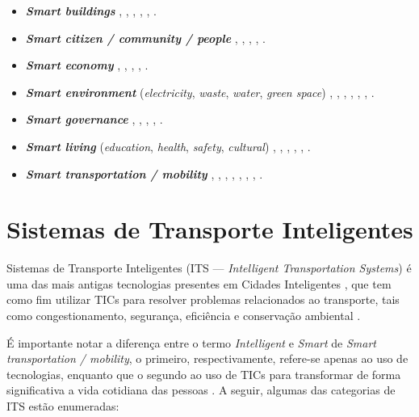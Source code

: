 \documentclass[
	12pt,				%
	oneside,			%
	a4paper,			%
	english,			%
	brazil				%
	]{abntex2ppgsi}
\begin{document}
\begin{itemize}
\item \textit{\textbf{Smart buildings}} \cite{Talari2017}, \cite{Moreno2017}, \cite{Ang2017}, \cite{Finger2017}, \cite{Santos2017}, \cite{Kummitha2017}.
\item \textit{\textit{\textbf{Smart citizen / community / people}}} \cite{Talari2017}, \cite{Santos2017}, \cite{Kummitha2017}, \cite{Barth2017}, \cite{Ahvenniemi2017}.
\item \textit{\textbf{Smart economy}} \cite{Santos2017}, \cite{Kummitha2017}, \cite{Barth2017}, \cite{Xiao2017}, \cite{Ahvenniemi2017}.
\item \textit{\textbf{Smart environment}} (\textit{electricity}, \textit{waste}, \textit{water}, \textit{green space}) \cite{Santos2017}, \cite{Finger2017}, \cite{Talari2017}, \cite{Ang2017}, \cite{Kummitha2017}, \cite{Barth2017}, \cite{Ahvenniemi2017}.
\item \textit{\textbf{Smart governance}} \cite{Talari2017}, \cite{Santos2017}, \cite{Kummitha2017}, \cite{Barth2017}, \cite{Ahvenniemi2017}.
\item \textit{\textbf{Smart living}} (\textit{education}, \textit{health}, \textit{safety}, \textit{cultural}) \cite{Santos2017}, \cite{Talari2017}, \cite{Kummitha2017}, \cite{Barth2017}, \cite{Xiao2017}, \cite{Ahvenniemi2017}.
\item \textit{\textbf{Smart transportation / mobility}} \cite{Talari2017}, \cite{Moreno2017}, \cite{Ang2017}, \cite{Finger2017}, \cite{Santos2017}, \cite{Kummitha2017}, \cite{Barth2017}, \cite{Ahvenniemi2017}.
\end{itemize}

\section{Sistemas de Transporte Inteligentes}
\label{its}

Sistemas de Transporte Inteligentes (ITS --- \textit{Intelligent Transportation Systems}) é uma das mais antigas tecnologias presentes em Cidades Inteligentes \cite{menouar2017uav}, que tem como fim utilizar TICs para resolver problemas relacionados ao transporte, tais como congestionamento, segurança, eficiência e conservação ambiental \cite{figueiredo2001towards}. 

É importante notar a diferença entre o termo \textit{Intelligent} e \textit{Smart} de \textit{Smart transportation / mobility}, o primeiro, respectivamente, refere-se apenas ao uso de tecnologias, enquanto que o segundo ao uso de TICs para transformar de forma significativa a vida cotidiana das pessoas \cite{albino2015smart}. A seguir, algumas das categorias de ITS estão enumeradas:
\end{document}
